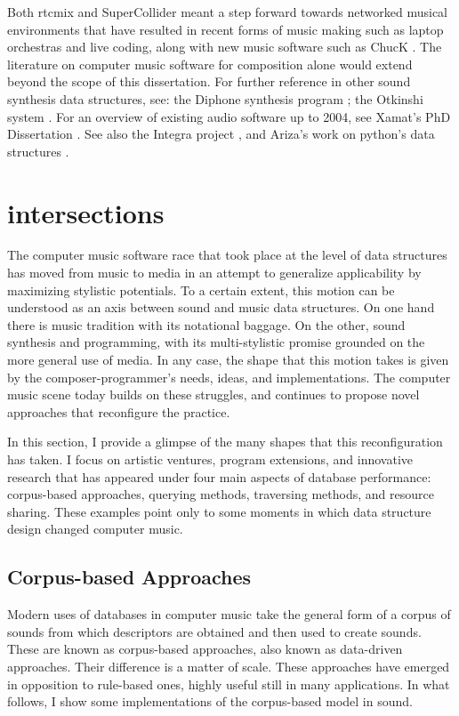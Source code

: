 \documentclass[
]{book}
\begin{document}
Both \gls{rtcmix} and SuperCollider meant a step forward towards networked musical environments that have resulted in recent forms of music making such as laptop orchestras and live coding, along with new music software such as ChucK \parencite{DBLP:conf/icmc/WangC03}. The literature on computer music software for composition alone would extend beyond the scope of this dissertation. For further reference in other sound synthesis data structures, see: the Diphone synthesis program \parencites{DBLP:conf/icmc/RodetDP88}{Rodet1989}{DBLP:conf/icmc/DepalleRGE93}{DBLP:conf/icmc/RodetL96}{DBLP:conf/icmc/RodetL97}; the Otkinshi system \parencite{icmc/bbp2372.2002.039}. For an overview of existing audio software up to 2004, see Xamat's PhD Dissertation \parencite[Chapter~2]{Amatriain/2004/phdthesis}. See also the Integra project \parencites{Bullock2009}{Bullock2011}, and Ariza's work on python's data structures \parencite{Ari05:Ano}. %

\section{intersections}
The computer music software race that took place at the level of data structures has moved from music to media in an attempt to generalize applicability by maximizing stylistic potentials. To a certain extent, this motion can be understood as an axis between sound and music data structures. On one hand there is music tradition with its notational baggage. On the other, sound synthesis and programming, with its multi-stylistic promise grounded on the more general use of media. In any case, the shape that this motion takes is given by the composer-programmer's needs, ideas, and implementations. The computer music scene today builds on these struggles, and continues to propose novel approaches that reconfigure the practice.

In this section, I provide a glimpse of the many shapes that this reconfiguration has taken. I focus on artistic ventures, program extensions, and innovative research that has appeared under four main aspects of database performance: corpus-based approaches, querying methods, traversing methods, and resource sharing. These examples point only to some moments in which data structure design changed computer music.

\subsection{Corpus-based Approaches}
Modern uses of databases in computer music take the general form of a corpus of sounds from which descriptors are obtained and then used to create sounds. These are known as corpus-based approaches, also known as data-driven approaches. Their difference is a matter of scale. These approaches have emerged in opposition to rule-based ones, highly useful still in many applications. In what follows, I show some implementations of the corpus-based model in sound.
\end{document}
